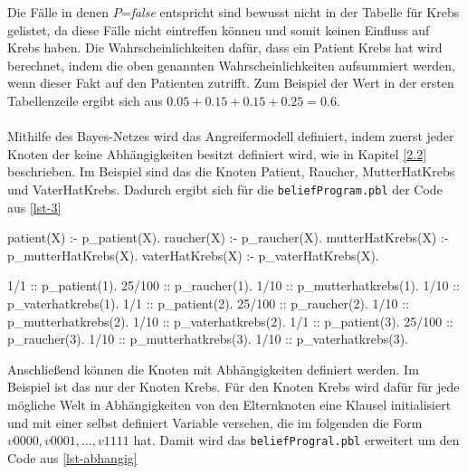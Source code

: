 \documentclass[german,version-2020-11]{uzl-thesis}
\begin{document}
\noindent 
Die Fälle in denen $P$=\textit{false} entspricht sind bewusst nicht in der Tabelle für Krebs gelistet, da diese Fälle nicht eintreffen können und somit keinen Einfluss auf Krebs haben. Die Wahrscheinlichkeiten dafür, dass ein Patient Krebs hat wird berechnet, indem die oben genannten Wahrscheinlichkeiten aufsummiert werden, wenn dieser Fakt auf den Patienten zutrifft. Zum Beispiel der Wert in der ersten Tabellenzeile ergibt sich aus $0.05 + 0.15 + 0.15 +0.25 = 0.6$. \\ \\
Mithilfe des Bayes-Netzes wird das Angreifermodell definiert, indem zuerst jeder Knoten der keine Abhängigkeiten besitzt definiert wird, wie in Kapitel \cref{2.2} beschrieben. Im Beispiel sind das die Knoten Patient, Raucher, MutterHatKrebs und VaterHatKrebs. Dadurch ergibt sich für die \texttt{beliefProgram.pbl} der Code aus \autoref{lst-3}
\begin{Pseudocode}[caption={Beispiel für Knoten ohne Abhängigkeiten }, label={lst-3}, numbers=left]
patient(X) :- p_patient(X).
raucher(X) :- p_raucher(X).
mutterHatKrebs(X) :- p_mutterHatKrebs(X).
vaterHatKrebs(X) :- p_vaterHatKrebs(X).
	
1/1 :: p_patient(1).
25/100 :: p_raucher(1).
1/10 :: p_mutterhatkrebs(1).
1/10 :: p_vaterhatkrebs(1).
1/1 :: p_patient(2).
25/100 :: p_raucher(2).
1/10 :: p_mutterhatkrebs(2).
1/10 :: p_vaterhatkrebs(2).
1/1 :: p_patient(3).
25/100 :: p_raucher(3).
1/10 :: p_mutterhatkrebs(3).
1/10 :: p_vaterhatkrebs(3).
\end{Pseudocode}
Anschließend können die Knoten mit Abhängigkeiten definiert werden. Im Beispiel ist das nur der Knoten Krebs. Für den Knoten Krebs wird dafür für jede mögliche Welt in Abhängigkeiten von den Elternknoten eine Klausel initialisiert und mit einer selbst definiert Variable versehen, die im folgenden die Form $v0000, v0001, \dots , v1111$ hat. Damit wird das \texttt{beliefProgral.pbl} erweitert um den Code aus \autoref{lst-abhangig} 
\end{document}
